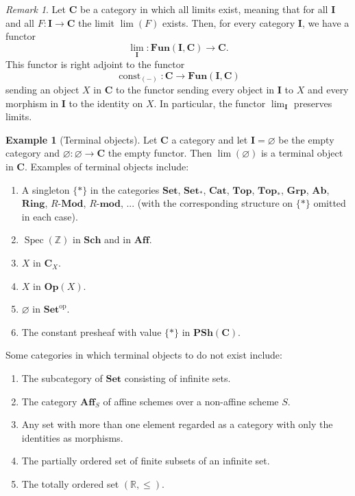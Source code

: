 \documentclass[12pt,a4paper]{amsart}
\theoremstyle{plain}
\theoremstyle{definition}
\newtheorem{exmp}[thm]{Example}
\theoremstyle{remark}
\newtheorem{rem}[thm]{Remark}
\begin{document}
\begin{rem}
  Let $\mathbf{C}$ be a category in which all limits exist, meaning that for all $\mathbf{I}$ and all $F \colon \mathbf{I} \to \mathbf{C}$ the limit $\lim(F)$ exists.
  Then, for every category $\mathbf{I}$, we have a functor
  \[ \lim_{\mathbf{I}} \colon \mathbf{Fun}(\mathbf{I}, \mathbf{C}) \to \mathbf{C}. \]
  This functor is right adjoint to the functor
  \[ \operatorname{const}_{(-)} \colon \mathbf{C} \to \mathbf{Fun}(\mathbf{I}, \mathbf{C}) \]
  sending an object $X$ in $\mathbf{C}$ to the functor sending every object in $\mathbf{I}$ to $X$ and every morphism in $\mathbf{I}$ to the identity on $X$.
  In particular, the functor $\operatorname{lim}_{\mathbf{I}}$ preserves limits.
\end{rem}

\begin{exmp}[Terminal objects]
  Let $\mathbf{C}$ a category and let $\mathbf{I} = \varnothing$ be the empty category and $\varnothing \colon \varnothing \to \mathbf{C}$ the empty functor.
  Then $\lim(\varnothing)$ is a terminal object in $\mathbf{C}$.
  Examples of terminal objects include:
  \begin{enumerate}
    \item A singleton $\{ * \}$ in the categories $\mathbf{Set}$, $\mathbf{Set}_{*}$, $\mathbf{Cat}$, $\mathbf{Top}$, $\mathbf{Top}_{*}$, $\mathbf{Grp}$, $\mathbf{Ab}$, $\mathbf{Ring}$, $R$-$\mathbf{Mod}$, $R$-$\mathbf{mod}$, ... (with the corresponding structure on $\{ * \}$ omitted in each case).
    \item $\operatorname{Spec}(\mathbb{Z})$ in $\mathbf{Sch}$ and in $\mathbf{Aff}$.
    \item $X$ in $\mathbf{C}_{X}$.
    \item $X$ in $\mathbf{Op}(X)$.
    \item $\varnothing$ in $\mathbf{Set}^{\mathrm{op}}$.
    \item The constant presheaf with value $\{ * \}$ in $\mathbf{PSh}(\mathbf{C})$.
  \end{enumerate}
  Some categories in which terminal objects to do not exist include:
  \begin{enumerate}
    \item The subcategory of $\mathbf{Set}$ consisting of infinite sets.
    \item The category $\mathbf{Aff}_{S}$ of affine schemes over a non-affine scheme $S$.
    \item Any set with more than one element regarded as a category with only the identities as morphisms.
    \item The partially ordered set of finite subsets of an infinite set.
    \item The totally ordered set $(\mathbb{R},\leq)$.
  \end{enumerate}
\end{exmp}
\end{document}

